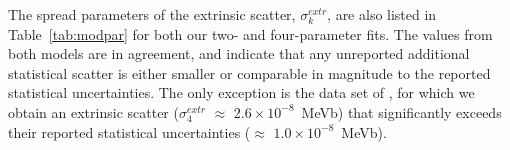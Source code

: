\documentclass[twocolumn]{aastex63}
\newcommand{\cmark}{\ding{51}}%
\newcommand{\xmark}{\textcolor{lightgray}{\ding{55}}}
\begin{document}
The spread parameters of the extrinsic scatter, $\sigma_k^{extr}$, are also listed in Table~\ref{tab:modpar} for both our two- and four-parameter fits. The values from both models are in agreement, and indicate that any unreported additional statistical scatter is either smaller or comparable in magnitude to the reported statistical uncertainties. The only exception is the data set of \citet{Sch97}, for which we obtain an extrinsic scatter ($\sigma_4^{extr}$ $\approx$ $2.6\times 10^{-8}$~MeVb) that significantly exceeds their reported statistical uncertainties ($\approx$ $1.0 \times 10^{-8}$~MeVb).

\end{document}
